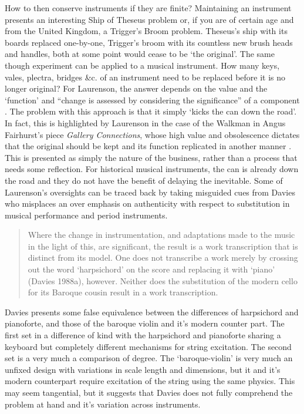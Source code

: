 How to then conserve instruments if they are finite?  Maintaining an instrument presents an interesting Ship of Theseus problem or, if you are of certain age and from the United Kingdom, a Trigger's Broom problem. Theseus's ship with its boards replaced one-by-one, Trigger's broom with its countless new brush heads and handles, both at some point would cease to be `the original'. 
The same though experiment can be applied to a musical instrument. 
How many keys, vales, plectra, bridges \&c. of an instrument need to be replaced before it is no longer original? 
For Laurenson, the answer depends on the value and the `function' and ``change is assessed by considering the significance'' of a component \cite{laurenson_management_2005}.
The problem with this approach is that it simply `kicks the can down the road'. 
In fact, this is highlighted by Laurenson in the case of the Walkman in Angus Fairhurst’s piece \textit{Gallery Connections}, whose high value and obsolescence dictates that the original should be kept and its function replicated in another manner \cite{laurenson_management_2005}.
This is presented as simply the nature of the business, rather than a process that needs some reflection.
For historical musical instruments, the can is already down the road and they do not have the benefit of delaying the inevitable.
Some of Laurenson's oversights can be traced back by taking misguided cues from Davies \cite{davies_authenticity_2001} who misplaces an over emphasis on authenticity with respect to substitution in musical performance and period instruments.

\begin{quotation}
Where the change in instrumentation, and adaptations made to the music in the light of this, are significant, the result is a work transcription that is distinct from its model. One does not transcribe a work merely by crossing out the word ‘harpsichord’ on the score and replacing it with ‘piano’ (Davies 1988a), however. Neither does the substitution of the modern cello for its Baroque cousin result in a work transcription. 
\end{quotation}

Davies presents some false equivalence between the differences of harpsichord and pianoforte, and those of the baroque violin and it's modern counter part.
The first set in a difference of kind with the harpsichord and pianoforte sharing a keyboard but completely different mechanisms for string excitation. 
The second set is a very much a comparison of degree. The `baroque-violin' is very much an unfixed design with variations in scale length and dimensions, but it and it's modern counterpart require excitation of the string using the same physics.
This may seem tangential, but it suggests that Davies does not fully comprehend the problem at hand and it's variation across instruments.

